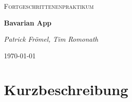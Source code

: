 \documentclass[a4paper]{article}
\begin{document}
	\begin{titlepage}
		\centering
		{\scshape\Large Fortgeschrittenenpraktikum\par}
		\vspace{1.5cm}
		{\huge\bfseries Bavarian App\par}
		\vspace{2cm}
		{\Large\itshape Patrick Frömel, Tim Romonath\par}
		\vfill
		{\large \today\par}
	\end{titlepage}
   	
   	\tableofcontents
    \newpage
	
	\section{Kurzbeschreibung}
		
\end{document}
